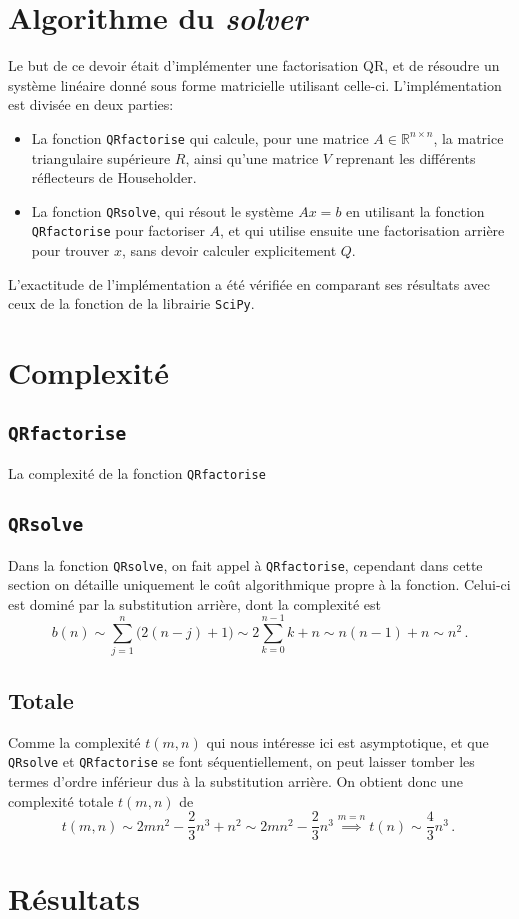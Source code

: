 \documentclass[11pt]{article}
\begin{document}
\section{Algorithme du \emph{solver}}
Le but de ce devoir était d'implémenter une factorisation QR, et de résoudre un système linéaire donné sous forme matricielle utilisant celle-ci.
L'implémentation est divisée en deux parties:
\begin{itemize}
	\item La fonction \texttt{QRfactorise} qui calcule, pour une matrice $A \in \mathbb{R}^{n \times n}$, la matrice triangulaire supérieure $R$, ainsi qu'une matrice $V$ reprenant les différents réflecteurs de Householder.
	\item La fonction \texttt{QRsolve}, qui résout le système $Ax = b$ en utilisant la fonction \texttt{QRfactorise} pour factoriser $A$, et qui utilise ensuite une factorisation arrière pour trouver $x$, sans devoir calculer explicitement $Q$. 
\end{itemize}
L'exactitude de l'implémentation a été vérifiée en comparant ses résultats avec ceux de la fonction de la librairie \texttt{SciPy}.

\section{Complexité}
\subsection{\texttt{QRfactorise}}
La complexité de la fonction \texttt{QRfactorise} %
\subsection{\texttt{QRsolve}}
Dans la fonction \texttt{QRsolve}, on fait appel à \texttt{QRfactorise},
cependant dans cette section on détaille uniquement le coût algorithmique propre à la fonction.
Celui-ci est dominé par la substitution arrière,
dont la complexité est
\[
b(n) \sim \sum_{j=1}^{n} \big(2(n - j) + 1 \big) \sim 2 \sum_{k=0}^{n-1} k + n \sim n (n - 1) + n \sim n^2\,.
\]
\subsection{Totale}
Comme la complexité $t(m, n)$ qui nous intéresse ici est asymptotique,
et que \texttt{QRsolve} et \texttt{QRfactorise} se font séquentiellement,
on peut laisser tomber les termes d'ordre inférieur dus à la substitution arrière.
On obtient donc une complexité totale $t(m, n)$ de
\[
t(m, n) \sim 2 mn^2 - \frac{2}{3}n^3 + n^2 \sim 2mn^2 - \frac{2}{3}n^3 \overset{m = n}{\implies} t(n) \sim \frac{4}{3} n^3\,.\ 
\]
\section{Résultats}
\end{document}
